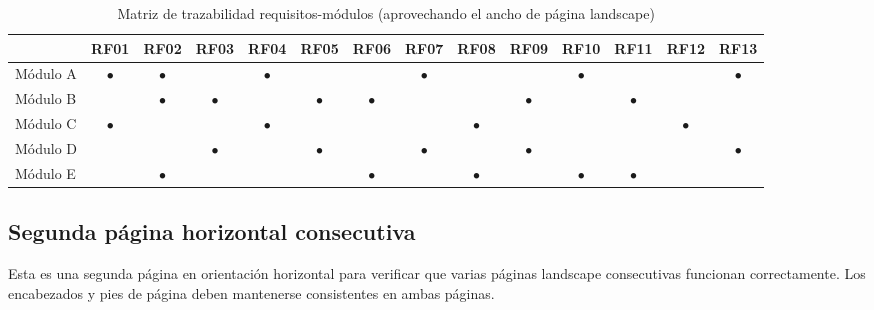 \vspace{0.3cm}

\begin{table}[htbp]
  \centering
  \small
  \caption{Matriz de trazabilidad requisitos-módulos (aprovechando el ancho de página landscape)}
  \label{tab:trazabilidad-landscape}
  \EPScabeceraTabla
  \begin{tabular}{l|ccccccccccccc}
    \toprule
    & \textbf{RF01} & \textbf{RF02} & \textbf{RF03} & \textbf{RF04} & \textbf{RF05} &
      \textbf{RF06} & \textbf{RF07} & \textbf{RF08} & \textbf{RF09} & \textbf{RF10} &
      \textbf{RF11} & \textbf{RF12} & \textbf{RF13} \\
    \midrule
    Módulo A & $\bullet$ & $\bullet$ &           & $\bullet$ &           &           & $\bullet$ &           &           & $\bullet$ &           &           & $\bullet$ \\
    Módulo B &           & $\bullet$ & $\bullet$ &           & $\bullet$ & $\bullet$ &           &           & $\bullet$ &           & $\bullet$ &           &           \\
    Módulo C & $\bullet$ &           &           & $\bullet$ &           &           &           & $\bullet$ &           &           &           & $\bullet$ &           \\
    Módulo D &           &           & $\bullet$ &           & $\bullet$ &           & $\bullet$ &           & $\bullet$ &           &           &           & $\bullet$ \\
    Módulo E &           & $\bullet$ &           &           &           & $\bullet$ &           & $\bullet$ &           & $\bullet$ & $\bullet$ &           &           \\
    \bottomrule
  \end{tabular}
\end{table}

\newpage

\subsection{Segunda página horizontal consecutiva}
\label{subsec:segunda-landscape}

Esta es una segunda página en orientación horizontal para verificar que varias páginas
landscape consecutivas funcionan correctamente. Los encabezados y pies de página
deben mantenerse consistentes en ambas páginas.

